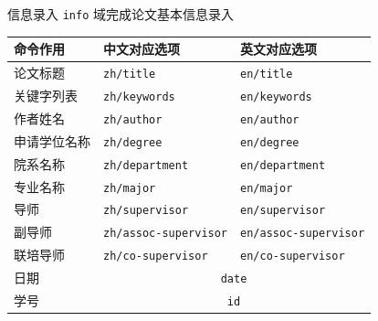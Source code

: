 \begin{frame}[fragile]{信息录入}
  \verb|info| 域完成论文基本信息录入
  \begin{table}[h]
    \centering
    \footnotesize
    \begin{tabular}{lll}\toprule
      命令作用   & 中文对应选项                            & 英文对应选项                       \\ \midrule
      论文标题   & \texttt{zh/title}                 & \texttt{en/title}            \\
      关键字列表  & \texttt{zh/keywords}              & \texttt{en/keywords}         \\
      作者姓名   & \texttt{zh/author}                & \texttt{en/author}           \\
      申请学位名称 & \texttt{zh/degree}                & \texttt{en/degree}           \\
      院系名称   & \texttt{zh/department}            & \texttt{en/department}       \\
      专业名称   & \texttt{zh/major}                 & \texttt{en/major}            \\
      导师     & \texttt{zh/supervisor}            & \texttt{en/supervisor}       \\
      副导师    & \texttt{zh/assoc-supervisor}      & \texttt{en/assoc-supervisor} \\
      联培导师   & \texttt{zh/co-supervisor}         & \texttt{en/co-supervisor}    \\
      日期     & \multicolumn{2}{c}{\texttt{date}}                                \\
      学号     & \multicolumn{2}{c}{\texttt{id}}                                  \\ \bottomrule
    \end{tabular}
  \end{table}
\end{frame}

